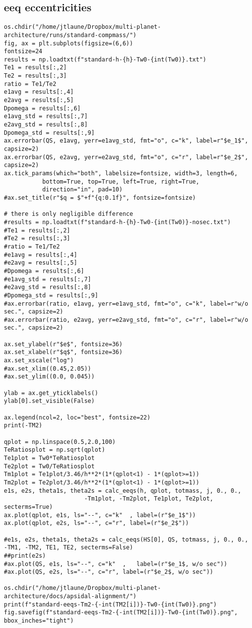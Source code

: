 \documentclass[11pt]{article}
\begin{document}
\subsection{eeq eccentricities}
\label{sec:org6ca475f}
\begin{verbatim}
os.chdir("/home/jtlaune/Dropbox/multi-planet-architecture/runs/standard-compmass/")
fig, ax = plt.subplots(figsize=(6,6))
fontsize=24
results = np.loadtxt(f"standard-h-{h}-Tw0-{int(Tw0)}.txt")
Te1 = results[:,2]
Te2 = results[:,3]
ratio = Te1/Te2
e1avg = results[:,4]
e2avg = results[:,5]
Dpomega = results[:,6]
e1avg_std = results[:,7]
e2avg_std = results[:,8]
Dpomega_std = results[:,9]
ax.errorbar(QS, e1avg, yerr=e1avg_std, fmt="o", c="k", label=r"$e_1$", capsize=2)
ax.errorbar(QS, e2avg, yerr=e2avg_std, fmt="o", c="r", label=r"$e_2$", capsize=2)
ax.tick_params(which="both", labelsize=fontsize, width=3, length=6,
	       bottom=True, top=True, left=True, right=True,
	       direction="in", pad=10)
#ax.set_title(r"$q = $"+f"{q:0.1f}", fontsize=fontsize)

# there is only negligible difference
#results = np.loadtxt(f"standard-h-{h}-Tw0-{int(Tw0)}-nosec.txt")
#Te1 = results[:,2]
#Te2 = results[:,3]
#ratio = Te1/Te2
#e1avg = results[:,4]
#e2avg = results[:,5]
#Dpomega = results[:,6]
#e1avg_std = results[:,7]
#e2avg_std = results[:,8]
#Dpomega_std = results[:,9]
#ax.errorbar(ratio, e1avg, yerr=e1avg_std, fmt="o", c="k", label=r"w/o sec.", capsize=2)
#ax.errorbar(ratio, e2avg, yerr=e2avg_std, fmt="o", c="r", label=r"w/o sec.", capsize=2)

ax.set_ylabel(r"$e$", fontsize=36)
ax.set_xlabel(r"$q$", fontsize=36)
ax.set_xscale("log")
#ax.set_xlim((0.45,2.05))
#ax.set_ylim((0.0, 0.045))

ylab = ax.get_yticklabels()
ylab[0].set_visible(False)

ax.legend(ncol=2, loc="best", fontsize=22)
print(-TM2)

qplot = np.linspace(0.5,2.0,100)
TeRatiosplot = np.sqrt(qplot)
Te1plot = Tw0*TeRatiosplot
Te2plot = Tw0/TeRatiosplot
Tm1plot = Te1plot/3.46/h**2*(1*(qplot<1) - 1*(qplot>=1))
Tm2plot = Te2plot/3.46/h**2*(1*(qplot<1) - 1*(qplot>=1))
e1s, e2s, theta1s, theta2s = calc_eeqs(h, qplot, totmass, j, 0., 0.,
				       -Tm1plot, -Tm2plot, Te1plot, Te2plot, secterms=True)
ax.plot(qplot, e1s, ls="--", c="k"  , label=(r"$e_1$"))
ax.plot(qplot, e2s, ls="--", c="r", label=(r"$e_2$"))

#e1s, e2s, theta1s, theta2s = calc_eeqs(HS[0], QS, totmass, j, 0., 0., -TM1, -TM2, TE1, TE2, secterms=False)
##print(e2s)
#ax.plot(QS, e1s, ls="--", c="k"  ,   label=(r"$e_1$, w/o sec"))
#ax.plot(QS, e2s, ls="--", c="r", label=(r"$e_2$, w/o sec"))

os.chdir("/home/jtlaune/Dropbox/multi-planet-architecture/docs/apsidal-alignment/")
print(f"standard-eeqs-Tm2-{-int(TM2[i])}-Tw0-{int(Tw0)}.png")
fig.savefig(f"standard-eeqs-Tm2-{-int(TM2[i])}-Tw0-{int(Tw0)}.png", bbox_inches="tight")
\end{verbatim}
\end{document}
